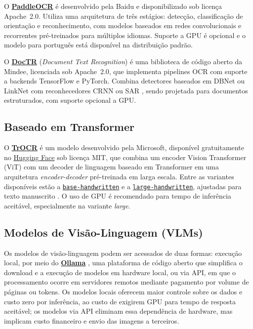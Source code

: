 \documentclass[noabntexcite,oneside]{ufsc-thesis-rn46-2019}
\begin{document}
O \href{https://github.com/PaddlePaddle/PaddleOCR}{\textbf{PaddleOCR}}
\cite{paddleocr2022} é desenvolvido pela Baidu e disponibilizado sob licença Apache~2.0.
Utiliza uma arquitetura de três estágios: detecção, classificação de orientação e
reconhecimento, com modelos baseados em redes convolucionais e recorrentes
pré-treinados para múltiplos idiomas. Suporte a GPU é opcional e o modelo para português
está disponível na distribuição padrão.

O \href{https://github.com/mindee/doctr}{\textbf{DocTR}} (\textit{Document Text
Recognition}) \cite{doctr2021} é uma biblioteca de código aberto da Mindee, licenciada
sob Apache~2.0, que implementa pipelines OCR com suporte a backends TensorFlow e PyTorch.
Combina detectores baseados em DBNet \cite{liao2020} ou LinkNet \cite{chaurasia2017}
com reconhecedores CRNN \cite{shi2017} ou SAR \cite{li2019sar}, sendo projetada para
documentos estruturados, com suporte opcional a GPU.

\subsection{Baseado em Transformer}

O \href{https://huggingface.co/microsoft/trocr-base-handwritten}{\textbf{TrOCR}}
\cite{huang2021} é um modelo desenvolvido pela Microsoft, disponível gratuitamente no
\href{https://huggingface.co/microsoft/trocr-base-handwritten}{Hugging Face} sob licença
MIT, que combina um encoder Vision Transformer (ViT) com um decoder de linguagem baseado
em Transformer em uma arquitetura \textit{encoder-decoder} pré-treinada em larga escala.
Entre as variantes disponíveis estão a
\href{https://huggingface.co/microsoft/trocr-base-handwritten}{\texttt{base-handwritten}}
e a
\href{https://huggingface.co/microsoft/trocr-large-handwritten}{\texttt{large-handwritten}},
ajustadas para texto manuscrito \cite{huang2021}. O uso de GPU é recomendado para
tempo de inferência aceitável, especialmente na variante \textit{large}.

\subsection{Modelos de Visão-Linguagem (VLMs)}

Os modelos de visão-linguagem podem ser acessados de duas formas: execução local, por meio do
\href{https://ollama.com}{\textbf{Ollama}} \cite{ollama2023}, uma plataforma de código
aberto que simplifica o download e a execução de modelos em hardware local, ou via
API, em que o processamento ocorre em servidores remotos mediante pagamento por volume
de páginas ou tokens. Os modelos locais oferecem maior controle sobre os dados e custo
zero por inferência, ao custo de exigirem GPU para tempo de resposta aceitável; os
modelos via API eliminam essa dependência de hardware, mas implicam custo financeiro e
envio das imagens a terceiros.
\end{document}
